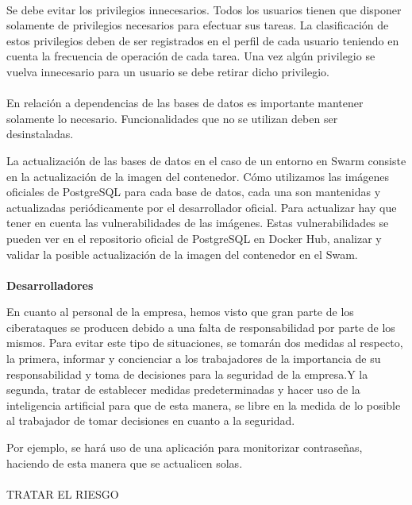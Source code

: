 \paragraph{}
Se debe evitar los privilegios innecesarios. Todos los usuarios tienen que disponer solamente de privilegios necesarios para efectuar sus tareas. La clasificación de estos privilegios deben de ser registrados en el perfil de cada usuario teniendo en cuenta la frecuencia de operación de cada tarea. Una vez algún privilegio se vuelva innecesario para un usuario se debe retirar dicho privilegio.
\paragraph{}
En relación a dependencias de las bases de datos es importante mantener solamente lo necesario. Funcionalidades que no se utilizan deben ser desinstaladas.

La actualización de las bases de datos en el caso de un entorno en Swarm consiste en la actualización de la imagen del contenedor. Cómo utilizamos las imágenes oficiales de PostgreSQL para cada base de datos, cada una son mantenidas y actualizadas periódicamente por el desarrollador oficial. Para actualizar hay que tener en cuenta las vulnerabilidades de las imágenes. Estas vulnerabilidades se pueden ver en el repositorio oficial de PostgreSQL en Docker Hub, analizar y validar la posible actualización de la imagen del contenedor en el Swam.
\paragraph{}
\textbf{Desarrolladores}

En cuanto al personal de la empresa, hemos visto que gran parte de los ciberataques se producen debido a una falta de responsabilidad por parte de los mismos. Para evitar este tipo de situaciones, se tomarán dos medidas al respecto, la primera, informar y concienciar a los trabajadores de la importancia de su responsabilidad y toma de decisiones para la seguridad de la empresa.Y la segunda, tratar de establecer medidas predeterminadas y hacer uso de la inteligencia artificial para que de esta manera, se libre en la medida de lo posible al trabajador de tomar decisiones en cuanto a la seguridad.

Por ejemplo, se hará uso de una aplicación para monitorizar contraseñas, haciendo de esta manera que se actualicen solas.
\paragraph{}
TRATAR EL RIESGO
